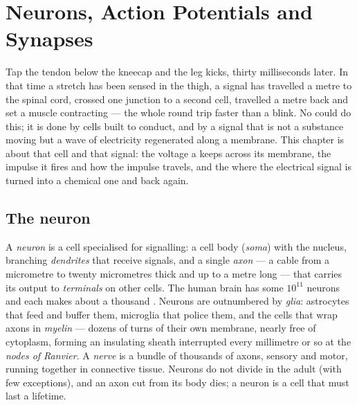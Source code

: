 \chapter{Neurons, Action Potentials and Synapses}\label{ch:b2:neurons-synapses}

Tap the tendon below the kneecap and the leg kicks, thirty
milliseconds later. In that time a stretch has been sensed in the
thigh, a signal has travelled a metre to the spinal cord, crossed
one junction to a second cell, travelled a metre back and set a
muscle contracting --- the whole round trip faster than a blink. No
 could do this; it is done by cells built to conduct, and by
a signal that is not a substance moving but a wave of electricity
regenerated along a membrane. This chapter is about that cell and
that signal: the voltage a  keeps across its membrane, the
impulse it fires and how the impulse travels, and the  where
the electrical signal is turned into a chemical one and back again.

\section{The neuron}

\begin{definition}\label{def:b2:neurons-synapses:neuron}
A \emph{neuron} is a cell specialised for signalling: a cell body
(\emph{soma}) with the nucleus, branching \emph{dendrites} that
receive signals, and a single \emph{axon} --- a cable from a
micrometre to twenty micrometres thick and up to a metre long ---
that carries its output to \emph{terminals} on other cells. The
human brain has some $10^{11}$ neurons and each makes about a
thousand . Neurons are outnumbered by \emph{glia}: astrocytes
that feed and buffer them, microglia that police them, and the
cells that wrap axons in \emph{myelin} --- dozens of turns of their
own membrane, nearly free of cytoplasm, forming an insulating sheath
interrupted every millimetre or so at the \emph{nodes of Ranvier}.
A \emph{nerve} is a bundle of thousands of axons, sensory and motor,
running together in connective tissue. Neurons do not divide in the
adult (with few exceptions), and an axon cut from its body dies; a
neuron is a cell that must last a lifetime.
\end{definition}

